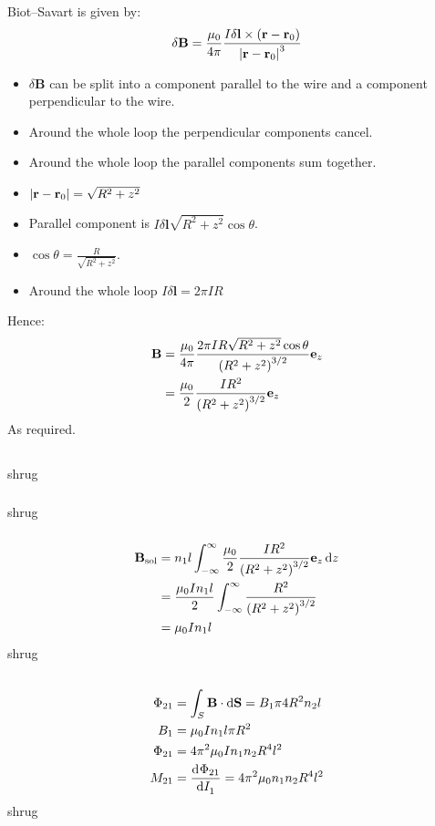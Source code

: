 \subsection{}
Biot–Savart is given by:
\begin{equation*}
    \delta \mathbf{B} = \frac{\mu_0}{4 \pi} \frac{I \delta \mathbf{l} \times \del{\mathbf{r} - \mathbf{r}_0}}{\abs{\mathbf{r} - \mathbf{r}_0}^3}
\end{equation*}

\begin{itemize}
    \item $ \delta \mathbf{B} $ can be split into a component parallel to the wire and a component perpendicular to the wire.
    \item Around the whole loop the perpendicular components cancel.
    \item Around the whole loop the parallel components sum together.
    \item $ \abs{\mathbf{r} - \mathbf{r}_0} = \sqrt{R^2 + z^2} $
    \item Parallel component is $ I \delta \mathbf{l} \sqrt{R^2 + z^2} \cos{\theta} $.
    \item $ \cos{\theta} = \frac{R}{\sqrt{R^2 + z^2}} $.
    \item Around the whole loop $ I \delta \mathbf{l} = 2 \pi I R $
\end{itemize}
Hence:
\begin{align*}
    \mathbf{B} & = \frac{\mu_0}{4 \pi} \frac{2 \pi I R \sqrt{R^2 + z^2} \cos{\theta}}{\del{R^2 + z^2}^{3/2}} \mathbf{e}_z\\
    & = \frac{\mu_0}{2} \frac{IR^2}{\del{R^2 + z^2}^{3/2}} \mathbf{e}_z
\end{align*}
As required.

\subsection{}
shrug

\subsubsection{}
shrug

\subsubsection{}
\begin{align*}
    \mathbf{B}_{\textrm{sol}} & = n_1 l \int_{-\infty}^{\infty} \frac{\mu_0}{2} \frac{IR^2}{\del{R^2 + z^2}^{3/2}} \mathbf{e}_z \dif z\\
    & = \frac{\mu_0 I n_1 l}{2} \int_{-\infty}^{\infty} \frac{R^2}{\del{R^2 + z^2}^{3/2}}\\
    & = \mu_0 I n_1 l
\end{align*}
shrug

\subsection{}
\begin{align*}
    \Phi_{21} & = \int_S \mathbf{B} \cdot \dif \mathbf{S} = B_1 \pi 4 R^2 n_2 l\\
    B_1 & = \mu_0 I n_1 l \pi R^2\\
    \Phi_{21} & = 4 \pi^2 \mu_0 I n_1 n_2 R^4 l^2\\
    M_{21} & = \dod{\Phi_{21}}{I_1} = 4 \pi^2 \mu_0 n_1 n_2 R^4 l^2
\end{align*}
shrug
